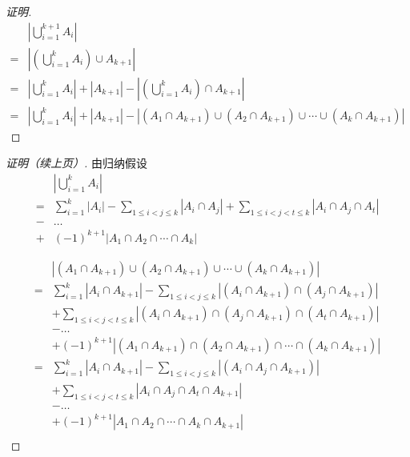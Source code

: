 \documentclass{beamer}
\begin{document}
\begin{CJK*}{UTF8}{gbsn}
\begin{frame}
\begin{proof}[证明]
  \begin{equation}\label{eq1}
    \begin{split}
      &|\bigcup_{i=1}^{k+1}A_i|\\
      =&|(\bigcup_{i=1}^kA_i) \cup A_{k+1}|\\
      =&|\bigcup_{i=1}^kA_i| + |A_{k+1}| - |(\bigcup_{i=1}^kA_i) \cap A_{k+1}|\\
      =&|\bigcup_{i=1}^kA_i| + |A_{k+1}| - |(A_1 \cap A_{k+1}) \cup (A_2 \cap A_{k+1}) \cup \cdots \cup (A_k \cap A_{k+1})|
    \end{split}
  \end{equation}
\end{proof}
\end{frame}
\begin{frame}
  \begin{proof}[证明（续上页）]
由归纳假设
  \begin{equation}\label{eq2}
\begin{split}
    &|\bigcup_{i=1}^kA_i|\\
=&\sum_{i=1}^k|A_i| - \sum_{1\leq i < j \leq k}|A_i \cap A_j| + \sum_{1 \leq  i < j < t \leq k}|A_i \cap A_j \cap A_t|\\
-&\ldots\\
+&(-1)^{k+1}|A_1 \cap A_2 \cap \cdots \cap A_k| 
  \end{split}
\end{equation}

  \begin{equation}\label{eq3}
    \begin{split}
      &|(A_1 \cap A_{k+1}) \cup (A_2 \cap A_{k+1}) \cup \cdots \cup (A_k \cap A_{k+1})|\\
      =&\sum_{i=1}^k|A_i \cap A_{k+1}| - \sum_{1\leq i < j \leq k}|(A_i \cap A_{k+1}) \cap (A_j \cap A_{k+1}) |\\
      &+ \sum_{1 \leq  i < j < t \leq k}|(A_i \cap A_{k+1}) \cap (A_j \cap A_{k+1}) \cap (A_t \cap A_{k+1})|\\
&-\ldots\\
&+(-1)^{k+1}|(A_1 \cap A_{k+1}) \cap (A_2 \cap A_{k+1}) \cap \cdots \cap (A_k \cap A_{k+1})| \\
      =&\sum_{i=1}^k|A_i \cap A_{k+1}| - \sum_{1\leq i < j \leq k}|(A_i  \cap A_j \cap A_{k+1}) |\\
      &+ \sum_{1 \leq  i < j < t \leq k}|A_i  \cap A_j  \cap A_t \cap A_{k+1}|\\
&-\ldots\\
&+(-1)^{k+1}|A_1  \cap A_2  \cap \cdots \cap A_k \cap A_{k+1}| \\
    \end{split}
  \end{equation}


\end{proof}
\end{frame}
\end{CJK*}
\end{document}
